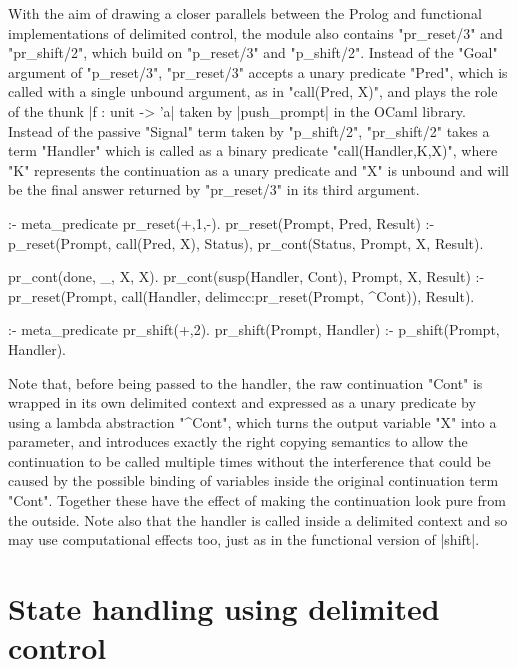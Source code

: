 With the aim of drawing a closer parallels between the Prolog and functional implementations of delimited
control, the module also contains "pr_reset/3" and "pr_shift/2", which build on "p_reset/3" and "p_shift/2".
Instead of the "Goal" argument of "p_reset/3", "pr_reset/3" accepts a unary predicate "Pred", which is
called with a single unbound argument, as in "call(Pred, X)", and plays the role of the thunk
|f : unit -> 'a| taken by |push_prompt| in the OCaml library. Instead of the passive "Signal" term
taken by "p_shift/2", "pr_shift/2" takes a term "Handler" which is called as
a binary predicate "call(Handler,K,X)", where "K" represents the continuation as a unary predicate 
and "X" is unbound and will be the final answer returned by "pr_reset/3" in its third argument.
\begin{prolog-framed}[name=delimcc, firstnumber=16]
  :- meta_predicate pr_reset(+,1,-).
  pr_reset(Prompt, Pred, Result) :-
     p_reset(Prompt, call(Pred, X), Status),
     pr_cont(Status, Prompt, X, Result).

  pr_cont(done, _, X, X).
  pr_cont(susp(Handler, Cont), Prompt, X, Result) :-
     pr_reset(Prompt, call(Handler, delimcc:pr_reset(Prompt, \X^Cont)), Result).

  :- meta_predicate pr_shift(+,2).
  pr_shift(Prompt, Handler) :- p_shift(Prompt, Handler).
\end{prolog-framed}
Note that, before being passed to the handler, the raw continuation "Cont" is wrapped in its
own delimited context
and expressed as a unary predicate by using a lambda abstraction "\X^Cont", which turns the 
output variable "X" into a parameter,
and introduces exactly the right copying semantics to allow the continuation to be
called multiple times without the interference that could be caused by the possible
binding of variables inside the original continuation term "Cont". Together these have the
effect of making the continuation look pure from the outside. Note also that the handler
is called inside a delimited context and so may use computational effects too, just as
in the functional version of |shift|.

\section{State handling using delimited control}

